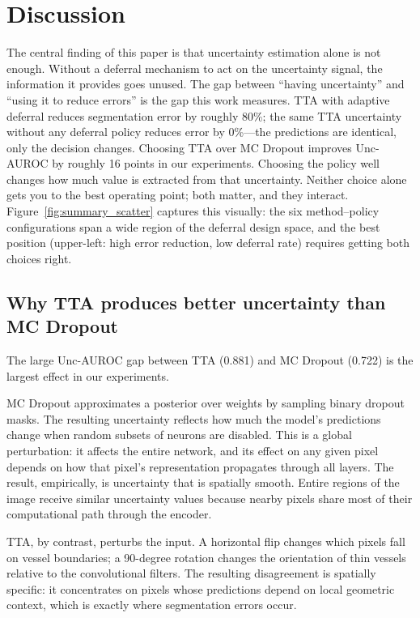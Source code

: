 \section{Discussion}
\label{sec:discussion}

The central finding of this paper is that uncertainty estimation alone is
not enough. Without a deferral mechanism to act on the uncertainty signal,
the information it provides goes unused. The gap between ``having uncertainty''
and ``using it to reduce errors'' is the gap this work measures. TTA with
adaptive deferral reduces segmentation error by roughly 80\%; the same TTA
uncertainty without any deferral policy reduces error by 0\%---the predictions
are identical, only the decision changes. Choosing TTA over MC Dropout
improves Unc-AUROC by roughly 16 points in our experiments.
Choosing the policy well changes how much value is extracted from that
uncertainty. Neither
choice alone gets you to the best operating point; both matter, and they
interact. Figure~\ref{fig:summary_scatter} captures this visually: the six
method--policy configurations span a wide region of the deferral design space,
and the best position (upper-left: high error reduction, low deferral rate)
requires getting both choices right.

\subsection{Why TTA produces better uncertainty than MC Dropout}

The large Unc-AUROC gap between TTA (0.881) and MC Dropout (0.722)
is the largest effect in our experiments.

MC Dropout approximates a posterior over weights by sampling binary dropout
masks. The resulting uncertainty reflects how much the model's predictions
change when random subsets of neurons are disabled. This is a global
perturbation: it affects the entire network, and its effect on any given
pixel depends on how that pixel's representation propagates through all
layers. The result, empirically, is uncertainty that is spatially smooth.
Entire regions of the image receive similar uncertainty values because
nearby pixels share most of their computational path through the encoder.

TTA, by contrast, perturbs the input. A horizontal flip changes which
pixels fall on vessel boundaries; a 90-degree rotation changes the
orientation of thin vessels relative to the convolutional filters. The
resulting disagreement is spatially specific: it concentrates on pixels
whose predictions depend on local geometric context, which is exactly
where segmentation errors occur.

